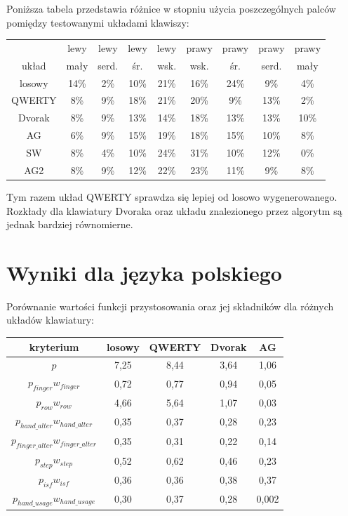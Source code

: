 \documentclass[brudnopis]{xmgr}
\begin{document}
Poniższa tabela przedstawia różnice w stopniu użycia poszczególnych palców pomiędzy testowanymi układami klawiszy:\newline\newline
\begin{tabular}{ c | c | c | c | c | c | c | c | c }
                & lewy & lewy  & lewy & lewy & prawy & prawy & prawy & prawy \\
  układ         & mały & serd. & śr. & wsk. & wsk. & śr. & serd. & mały \\
  \hline
  losowy        & 14\% & 2\% & 10\% & 21\% & 16\% & 24\% & 9\%  & 4\% \\
  QWERTY        &  8\% & 9\% & 18\% & 21\% & 20\% & 9\%  & 13\% & 2\% \\
  Dvorak        &  8\% & 9\% & 13\% & 14\% & 18\% & 13\% & 13\% & 10\% \\
  AG            &  6\% & 9\% & 15\% & 19\% & 18\% & 15\% & 10\% & 8\% \\
  SW            &  8\% & 4\% & 10\% & 24\% & 31\% & 10\% & 12\% & 0\% \\
  AG2           &  8\% & 9\% & 12\% & 22\% & 23\% & 11\% &  9\% & 8\% \\
\end{tabular}\newline

Tym razem układ QWERTY sprawdza się lepiej od losowo wygenerowanego. Rozkłady dla klawiatury Dvoraka oraz układu znalezionego przez algorytm są jednak bardziej równomierne.


\section{Wyniki dla języka polskiego}

Porównanie wartości funkcji przystosowania oraz jej składników dla różnych układów klawiatury:\newline\newline
\begin{tabular}{ c | c | c | c | c }
  kryterium         & losowy & QWERTY & Dvorak & AG \\
  \hline
  $p$			& 7,25 & 8,44 & 3,64 & 1,06 \\
  \hline
  $p_{finger} w_{finger}$                & 0,72 & 0,77 & 0,94 & 0,05 \\
  $p_{row} w_{row}$                      & 4,66 & 5,64 & 1,07 & 0,03 \\
  $p_{hand\_alter} w_{hand\_alter}$      & 0,35 & 0,37 & 0,28 & 0,23 \\
  $p_{finger\_alter} w_{finger\_alter}$  & 0,35 & 0,31 & 0,22 & 0,14 \\
  $p_{step} w_{step}$                    & 0,52 & 0,62 & 0,46 & 0,23 \\
  $p_{isf} w_{isf}$                      & 0,36 & 0,36 & 0,38 & 0,37 \\
  $p_{hand\_usage} w_{hand\_usage}$      & 0,30 & 0,37 & 0,28 & 0,002 \\
\end{tabular}\newline\newline
\end{document}
